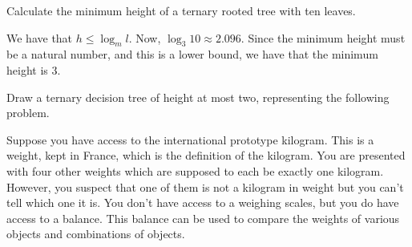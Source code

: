 \begin{questions}
\question
Calculate the minimum height of a ternary rooted tree with ten leaves.
\begin{solution}


We have that $h \leq  \log_m l$.
Now, $\log_3 10 \approx 2.096$.
Since the minimum height must be a natural number, and this is a lower bound, we have that the minimum height is 3.
\end{solution}

\question
Draw a ternary decision tree of height at most two, representing the following problem.

Suppose you have access to the international prototype kilogram.
This is a weight, kept in France, which is the definition of the kilogram.
You are presented with four other weights which are supposed to each be exactly one kilogram.
However, you suspect that one of them is not a kilogram in weight but you can't tell which one it is.
You don't have access to a weighing scales, but you do have access to a balance.
This balance can be used to compare the weights of various objects and combinations of objects.~\cite{biggs02}
\begin{solution}
\begin{center}
\end{center}


\end{solution}
\end{questions}
